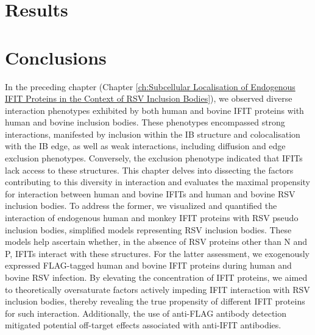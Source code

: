 \section{Results} \label{sec:Results-Chapter4}



\section{Conclusions} \label{sec:Conclusions-Chapter4}
In the preceding chapter (Chapter \ref{ch:Subcellular Localisation of Endogenous IFIT Proteins in the Context of RSV Inclusion Bodies}), we observed diverse interaction phenotypes exhibited by both human and bovine IFIT proteins with human and bovine inclusion bodies. These phenotypes encompassed strong interactions, manifested by inclusion within the IB structure and colocalisation with the IB edge, as well as weak interactions, including diffusion and edge exclusion phenotypes. Conversely, the exclusion phenotype indicated that IFITs lack access to these structures. This chapter delves into dissecting the factors contributing to this diversity in interaction and evaluates the maximal propensity for interaction between human and bovine IFITs and human and bovine RSV inclusion bodies. To address the former, we visualized and quantified the interaction of endogenous human and monkey IFIT proteins with RSV pseudo inclusion bodies, simplified models representing RSV inclusion bodies. These models help ascertain whether, in the absence of RSV proteins other than N and P, IFITs interact with these structures. For the latter assessment, we exogenously expressed FLAG-tagged human and bovine IFIT proteins during human and bovine RSV infection. By elevating the concentration of IFIT proteins, we aimed to theoretically oversaturate factors actively impeding IFIT interaction with RSV inclusion bodies, thereby revealing the true propensity of different IFIT proteins for such interaction. Additionally, the use of anti-FLAG antibody detection mitigated potential off-target effects associated with anti-IFIT antibodies.

